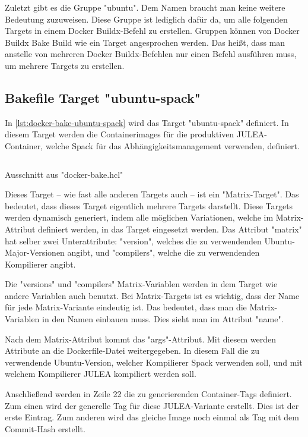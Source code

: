 Zuletzt gibt es die Gruppe "ubuntu". Dem Namen braucht man keine weitere Bedeutung zuzuweisen. Diese Gruppe ist lediglich dafür da, um alle folgenden Targets in einem Docker Buildx-Befehl zu erstellen. Gruppen können von Docker Buildx Bake Build wie ein Target angesprochen werden. Das heißt, dass man anstelle von mehreren Docker Buildx-Befehlen nur einen Befehl ausführen muss, um mehrere Targets zu erstellen.

\pagebreak

\subsection{Bakefile Target "ubuntu-spack"} \label{ubuntu-spack-target}

In \cref{lst:docker-bake-ubuntu-spack} wird das Target "ubuntu-spack" definiert. In diesem Target werden die Containerimages für die produktiven JULEA-Container, welche Spack für das Abhängigkeitsmanagement verwenden, definiert.

\begin{listing}[H]
    \inputminted[firstline=9,lastline=27]{./lexers/docker-bake-lexer.py}{./code-examples/docker-bake.hcl}
    \caption{Ausschnitt aus "docker-bake.hcl"}
    \label{lst:docker-bake-ubuntu-spack}
\end{listing}

Dieses Target – wie fast alle anderen Targets auch – ist ein "Matrix-Target". Das bedeutet, dass dieses Target eigentlich mehrere Targets darstellt. Diese Targets werden dynamisch generiert, indem alle möglichen Variationen, welche im Matrix-Attribut definiert werden, in das Target eingesetzt werden. Das Attribut "matrix" hat selber zwei Unterattribute: "version", welches die zu verwendenden Ubuntu-Major-Versionen angibt, und "compilers", welche die zu verwendenden Kompilierer angibt.

Die "versions" und "compilers" Matrix-Variablen werden in dem Target wie andere Variablen auch benutzt. 
Bei Matrix-Targets ist es wichtig, dass der Name für jede Matrix-Variante eindeutig ist. Das bedeutet, dass man die Matrix-Variablen in den Namen einbauen muss. Dies sieht man im Attribut "name".

Nach dem Matrix-Attribut kommt das "args"-Attribut. Mit diesem werden Attribute an die Dockerfile-Datei weitergegeben. In diesem Fall die zu verwendende Ubuntu-Version, welcher Kompilierer Spack verwenden soll, und mit welchem Kompilierer JULEA kompiliert werden soll. 

Anschließend werden in Zeile 22 die zu generierenden Container-Tags definiert. Zum einen wird der generelle Tag für diese JULEA-Variante erstellt. Dies ist der erste Eintrag. Zum anderen wird das gleiche Image noch einmal als Tag mit dem Commit-Hash erstellt.

